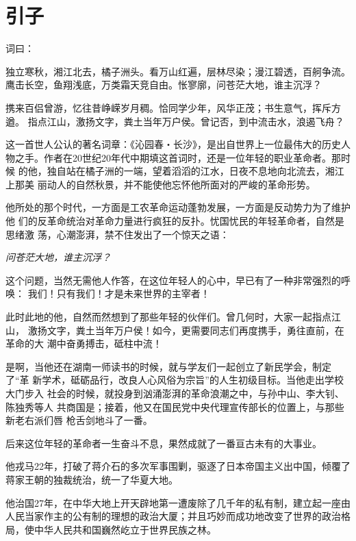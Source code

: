 \documentclass[../../dazhuan.tex]{subfiles}
\begin{document}
\chapter*{引\quad 子}

词曰：

\begin{xemph} 
独立寒秋，湘江北去，橘子洲头。看万山红遍，层林尽染；漫江碧透，百舸争流。
鹰击长空，鱼翔浅底，万类霜天竞自由。怅寥廓，问苍茫大地，谁主沉浮？

携来百侣曾游，忆往昔峥嵘岁月稠。恰同学少年，风华正茂；书生意气，挥斥方遒。
指点江山，激扬文字，粪土当年万户侯。曾记否，到中流击水，浪遏飞舟？
\end{xemph}

这一首世人公认的著名词章：《沁园春・长沙》，是出自世界上一位最伟大的历史人
物之手。作者在20世纪20年代中期填这首词时，还是一位年轻的职业革命者。那时候
的他，独自站在橘子洲的一端，望着滔滔的江水，日夜不息地向北流去，湘江上那美
丽动人的自然秋景，并不能使他忘怀他所面对的严峻的革命形势。

他所处的那个时代，一方面是工农革命运动蓬勃发展，一方面是反动势力为了维护他
们的反革命统治对革命力量进行疯狂的反扑。忧国忧民的年轻革命者，自然是思绪激
荡，心潮澎湃，禁不住发出了一个惊天之语：

{\centering\emph{问苍茫大地，谁主沉浮？}\par}

这个问题，当然无需他人作答，在这位年轻人的心中，早已有了一种非常强烈的呼唤：
我们！只有我们！才是未来世界的主宰者！

此时此地的他，自然而然想到了那些年轻的伙伴们。曾几何时，大家一起指点江山，
激扬文字，粪土当年万户侯！如今，更需要同志们再度携手，勇往直前，在革命的大
潮中奋勇搏击，砥柱中流！  
                               
是啊，当他还在湖南一师读书的时候，就与学友们一起创立了新民学会，制定了“革
新学术，砥砺品行，改良人心风俗为宗旨”的人生初级目标。当他走出学校大门步入
社会的时候，就投身到汹涌澎湃的革命浪潮之中，与孙中山、李大钊、陈独秀等人
共商国是；接着，他又在国民党中央代理宣传部长的位置上，与那些新老右派们唇
枪舌剑地斗了一番。

后来这位年轻的革命者一生奋斗不息，果然成就了一番亘古未有的大事业。

他戎马22年，打破了蒋介石的多次军事围剿，驱逐了日本帝国主义出中国，倾覆了
蒋家王朝的独裁统治，统一了华夏大地。  

他治国27年，在中华大地上开天辟地第一遭废除了几千年的私有制，建立起一座由
人民当家作主的公有制的理想的政治大厦；并且巧妙而成功地改变了世界的政治格
局，使中华人民共和国巍然屹立于世界民族之林。
 
\end{document}
